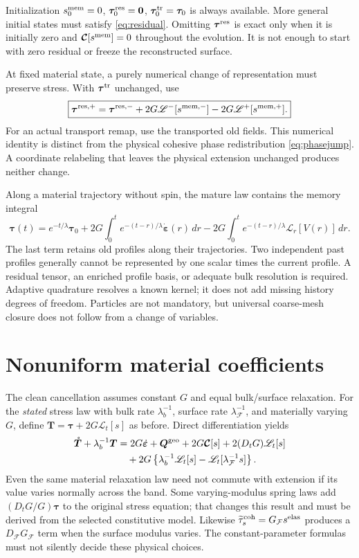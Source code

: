 \documentclass[10pt,letterpaper]{article}
\newcommand{\F}{\mathcal F}
\newcommand{\LL}{\mathscr L}
\newcommand{\CC}{\bm{\mathcal C}}
\newcommand{\ta}{\bm\tau}
\newcommand{\tat}{\bm\tau^{\rm tr}}
\newcommand{\tar}{\bm\tau^{\rm res}}
\newcommand{\Qgeo}{\bm Q^{\rm geo}}
\newcommand{\erate}{\dot{\bm\varepsilon}}
\newcommand{\sel}{s^{\rm elas}}
\newcommand{\smem}{s^{\rm mem}}
\newcommand{\Z}{\widetilde\tau_s^{\rm coh}}
\newcommand{\dt}{D_t}
\newcommand{\ds}{D_{\F}}
\newcommand{\rr}{\mathring}
\begin{document}
Initialization $\smem_0=0$, $\tar_0=\bm0$, $\tat_0=\ta_0$ is always available. More general initial states must satisfy \eqref{eq:residual}. Omitting $\tar$ is exact only when it is initially zero and $\CC[\smem]=0$ throughout the evolution. It is not enough to start with zero residual or freeze the reconstructed surface.

At fixed material state, a purely numerical change of representation must preserve stress. With $\tat$ unchanged, use
\begin{equation}
 \boxed{\bm\tau^{\rm res,+}=\bm\tau^{\rm res,-}+2G\LL^-[s^{\rm mem,-}]-2G\LL^+[s^{\rm mem,+}].} \label{eq:remap}
\end{equation}
For an actual transport remap, use the transported old fields. This numerical identity is distinct from the physical cohesive phase redistribution \eqref{eq:phasejump}. A coordinate relabeling that leaves the physical extension unchanged produces neither change.

Along a material trajectory without spin, the mature law contains the memory integral
\begin{equation}
 \ta(t)=e^{-t/\lambda}\ta_0+
 2G\int_0^t e^{-(t-r)/\lambda}\erate(r)\,dr
 -2G\int_0^t e^{-(t-r)/\lambda}\LL_r[V(r)]\,dr. \label{eq:memoryintegral}
\end{equation}
The last term retains old profiles along their trajectories. Two independent past profiles generally cannot be represented by one scalar times the current profile. A residual tensor, an enriched profile basis, or adequate bulk resolution is required. Adaptive quadrature resolves a known kernel; it does not add missing history degrees of freedom. Particles are not mandatory, but universal coarse-mesh closure does not follow from a change of variables.

\section{Nonuniform material coefficients}
The clean cancellation assumes constant $G$ and equal bulk/surface relaxation. For the \emph{stated} stress law with bulk rate $\lambda_b^{-1}$, surface rate $\lambda_\F^{-1}$, and materially varying $G$, define $\bm T=\ta+2G\LL_t[s]$ as before. Direct differentiation yields
\begin{align}
 \rr{\bm T}+\lambda_b^{-1}\bm T
 &=2G\erate+\Qgeo+2G\CC[s]+2(\dt G)\LL_t[s]\notag\\
 &\quad+2G\left\{\lambda_b^{-1}\LL_t[s]
                   -\LL_t[\lambda_\F^{-1}s]\right\}. \label{eq:variableG}
\end{align}
Even the same material relaxation law need not commute with extension if its value varies normally across the band. Some varying-modulus spring laws add $(\dt G/G)\ta$ to the original stress equation; that changes this result and must be derived from the selected constitutive model. Likewise $\Z=G_\F\sel$ produces a $\ds G_\F$ term when the surface modulus varies. The constant-parameter formulas must not silently decide these physical choices.
\end{document}
